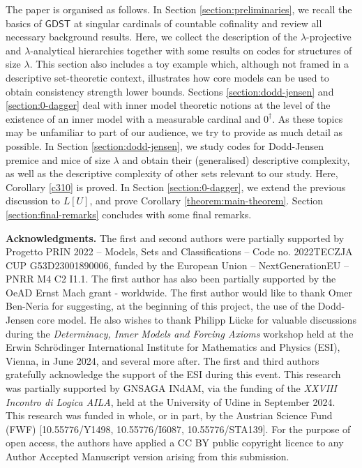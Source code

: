 \documentclass{amsart}
\numberwithin{equation}{section}
\theoremstyle{definition}
\theoremstyle{remark}
\begin{document}
  

    
    

    The paper is organised as follows. In Section \ref{section:preliminaries}, we recall the basics of $\mathsf{GDST}$ at singular cardinals of countable cofinality and review all necessary background results. Here, we collect the description of the $\lambda$-projective and $\lambda$-analytical hierarchies together with some results on codes for structures of size $\lambda$. This section also includes a toy example which, although not framed in a descriptive set-theoretic context, illustrates how core models can be used to obtain consistency strength lower bounds. Sections \ref{section:dodd-jensen} and \ref{section:0-dagger} deal with inner model theoretic notions at the level of the existence of an inner model with a measurable cardinal and $0^\dagger$. As these topics may be unfamiliar to part of our audience, we try to provide as much detail as possible. In Section \ref{section:dodd-jensen}, we study codes for Dodd-Jensen premice and mice of size $\lambda$ and obtain their (generalised) descriptive complexity, as well as the descriptive complexity of other sets relevant to our study. 
    Here, Corollary \ref{c310} is proved. In Section \ref{section:0-dagger}, we extend the previous discussion to $L[U]$, and prove Corollary \ref{theorem:main-theorem}. Section \ref{section:final-remarks} concludes with some final remarks.\newline

    \textbf{Acknowledgments.} The first and second authors were partially supported by \textsf{Progetto PRIN 2022 – Models, Sets and Classifications – Code no. 2022TECZJA CUP G53D23001890006, funded by the European Union – NextGenerationEU – PNRR M4 C2 I1.1}. The first author has also been partially supported by the \textsf{OeAD Ernst Mach grant - worldwide}. The first author would like to thank Omer Ben-Neria for suggesting, at the beginning of this project, the use of the Dodd-Jensen core model. He also wishes to thank Philipp Lücke for valuable discussions during the \emph{Determinacy, Inner Models and Forcing Axioms} workshop held at the Erwin Schrödinger International Institute for Mathematics and Physics (ESI), Vienna, in June 2024, and several more after. The first and third authors gratefully acknowledge the support of the ESI during this event. This research was partially supported by GNSAGA INdAM, via the funding of the \emph{XXVIII Incontro di Logica AILA}, held at the University of Udine in September 2024. This research was funded in whole, or in part, by the \textsf{Austrian Science Fund (FWF) [10.55776/Y1498, 10.55776/I6087, 10.55776/STA139]}. For the purpose of open access, the authors have applied a CC BY public copyright licence to any Author Accepted Manuscript version arising from this submission.
\end{document}
